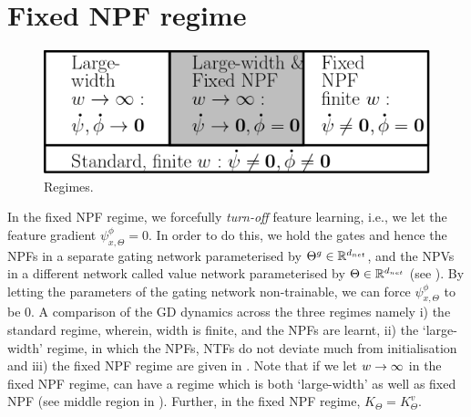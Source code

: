 \section{Fixed NPF regime}
\begin{figure}
\includegraphics[scale=0.25]{figs/regime.png}
\caption{\label{fig:regime} Regimes.}
\end{figure}
In the fixed NPF regime, we forcefully \emph{turn-off} feature learning, i.e., we let the feature gradient $\psi^{\phi}_{x,\Theta}=0$. In order to do this, we hold the gates and hence the NPFs in a separate gating network parameterised by ${\Theta}^g\in\mathbb{R}^{d_{net}}$, and the NPVs in a different network called value network parameterised by $\Theta\in\mathbb{R}^{d_{net}}$ (see ). By letting the parameters of the gating network non-trainable, we can force $\psi^{\phi}_{x,\Theta}$ to be $0$. \WFclear A comparison of the GD dynamics across the three regimes namely i) the standard regime, wherein, width is finite, and the NPFs are learnt, ii) the `large-width' regime, in which the NPFs, NTFs do not deviate much from initialisation and iii) the fixed NPF regime are given in . Note that if we let $w\rightarrow\infty$ in the fixed NPF regime, can have a regime which is both `large-width' as well as fixed NPF (see middle region in ). Further, in the fixed NPF regime, $K_{\Theta}=K^v_{\Theta}$.
\FloatBarrier
\begin{table}[h]\centering
{}
\caption{Dynamics in various regimes. Here $p\in[P], s\in[n]$.}
\label{tb:dynamics}
\end{table}

